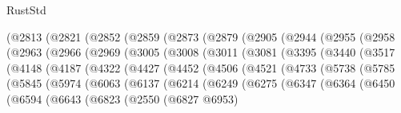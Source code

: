 \begin{lexlean}{RustStd}
\begin{coremodule}
      (@2813
        (@2821
          (@2852
            (@2859
              (@2873
                (@2879
                  (@2905
                    (@2944
                      (@2955
                        (@2958
                          (@2963
                            (@2966
                              (@2969
                                (@3005
                                  (@3008
                                    (@3011
                                      (@3081
                                        (@3395
                                          (@3440
                                            (@3517
                                              (@4148
                                                (@4187
                                                  (@4322
                                                    (@4427
                                                      (@4452
                                                        (@4506
                                                          (@4521
                                                            (@4733
                                                              (@5738
                                                                (@5785
                                                                  (@5845
                                                                    (@5974
                                                                      (@6063
                                                                        (@6137
                                                                          (@6214
                                                                            (@6249
                                                                              (@6275
                                                                                (@6347
                                                                                  (@6364
                                                                                    (@6450
                                                                                      (@6594
                                                                                        (@6643
                                                                                          (@6823
                                                                                            (@2550
                                                                                              (@6827
                                                                                                @6953)

\end{coremodule}
\end{lexlean}
